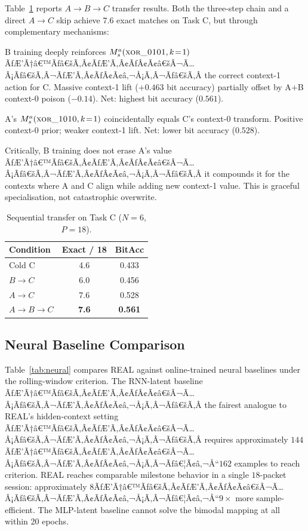 \documentclass[10pt,twocolumn]{article}
\newcommand{\Ms}{M_s}
\begin{document}
Table~\ref{tab:sequential} reports $A \to B \to C$ transfer results.
Both the three-step chain and a direct $A \to C$ skip achieve $7.6$ exact
matches on Task C, but through complementary mechanisms:

\begin{description}[leftmargin=1.2em, topsep=2pt]
  \item[$A\to B\to C$] B training deeply reinforces $\Ms^a(\textsc{xor\_0101},
    k\!=\!1)$ ÃƒÆ’Ã†â€™Ãƒâ€šÃ‚Â¢ÃƒÆ’Ã‚Â¢ÃƒÂ¢Ã¢â€šÂ¬Ã…Â¡Ãƒâ€šÃ‚Â¬ÃƒÆ’Ã‚Â¢ÃƒÂ¢Ã¢â‚¬Å¡Ã‚Â¬Ãƒâ€šÃ‚Â the correct context-1 action for C. Massive context-1 lift
    ($+0.463$ bit accuracy) partially offset by A$+$B context-0 poison
    ($-0.14$). Net: highest bit accuracy ($0.561$).
  \item[$A\to C$ direct] A's $\Ms^a(\textsc{xor\_1010}, k\!=\!1)$ coincidentally
    equals C's context-0 transform. Positive context-0 prior; weaker context-1
    lift. Net: lower bit accuracy ($0.528$).
\end{description}

Critically, B training does not erase A's value ÃƒÆ’Ã†â€™Ãƒâ€šÃ‚Â¢ÃƒÆ’Ã‚Â¢ÃƒÂ¢Ã¢â€šÂ¬Ã…Â¡Ãƒâ€šÃ‚Â¬ÃƒÆ’Ã‚Â¢ÃƒÂ¢Ã¢â‚¬Å¡Ã‚Â¬Ãƒâ€šÃ‚Â it compounds it for the
contexts where A and C align while adding new context-1 value.
This is graceful specialisation, not catastrophic overwrite.

\begin{table}[t]
\centering
\caption{Sequential transfer on Task C ($N=6$, $P=18$).}
\label{tab:sequential}
\small
\begin{tabular}{lcc}
\toprule
Condition & Exact / 18 & BitAcc \\
\midrule
Cold C       & 4.6 & 0.433 \\
$B\to C$     & 6.0 & 0.456 \\
$A\to C$     & 7.6 & 0.528 \\
$A\to B\to C$ & \textbf{7.6} & \textbf{0.561} \\
\bottomrule
\end{tabular}
\end{table}

\subsection{Neural Baseline Comparison}
\label{sec:neural}

Table~\ref{tab:neural} compares REAL against online-trained neural baselines
under the rolling-window criterion.
The RNN-latent baseline ÃƒÆ’Ã†â€™Ãƒâ€šÃ‚Â¢ÃƒÆ’Ã‚Â¢ÃƒÂ¢Ã¢â€šÂ¬Ã…Â¡Ãƒâ€šÃ‚Â¬ÃƒÆ’Ã‚Â¢ÃƒÂ¢Ã¢â‚¬Å¡Ã‚Â¬Ãƒâ€šÃ‚Â the fairest analogue to REAL's hidden-context setting
ÃƒÆ’Ã†â€™Ãƒâ€šÃ‚Â¢ÃƒÆ’Ã‚Â¢ÃƒÂ¢Ã¢â€šÂ¬Ã…Â¡Ãƒâ€šÃ‚Â¬ÃƒÆ’Ã‚Â¢ÃƒÂ¢Ã¢â‚¬Å¡Ã‚Â¬Ãƒâ€šÃ‚Â requires approximately $144$ÃƒÆ’Ã†â€™Ãƒâ€šÃ‚Â¢ÃƒÆ’Ã‚Â¢ÃƒÂ¢Ã¢â€šÂ¬Ã…Â¡Ãƒâ€šÃ‚Â¬ÃƒÆ’Ã‚Â¢ÃƒÂ¢Ã¢â‚¬Å¡Ã‚Â¬Ãƒâ€¦Ã¢â‚¬Å“$162$ examples to reach criterion.
REAL reaches comparable milestone behavior in a single $18$-packet session:
approximately $8$ÃƒÆ’Ã†â€™Ãƒâ€šÃ‚Â¢ÃƒÆ’Ã‚Â¢ÃƒÂ¢Ã¢â€šÂ¬Ã…Â¡Ãƒâ€šÃ‚Â¬ÃƒÆ’Ã‚Â¢ÃƒÂ¢Ã¢â‚¬Å¡Ã‚Â¬Ãƒâ€¦Ã¢â‚¬Å“$9\times$ more sample-efficient.
The MLP-latent baseline cannot solve the bimodal mapping at all within 20 epochs.
\end{document}
